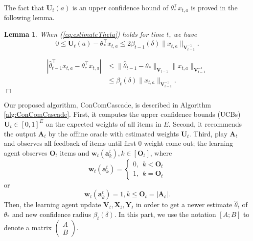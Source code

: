 \documentclass{article}
\newcommand{\bA}{\mathbf{A}}
\newcommand{\ba}{\mathbf{a}}
\newcommand{\bO}{\mathbf{O}}
\newcommand{\bU}{\mathbf{U}}
\newcommand{\bV}{\mathbf{V}}
\newcommand{\bw}{\mathbf{w}}
\newcommand{\bX}{\mathbf{X}}
\newcommand{\bY}{\mathbf{Y}}
\newcommand{\abs}[1]{\left| #1 \right|}
\newcommand{\norm}[1]{\| #1 \|}
\newtheorem{lemma}[theorem]{Lemma}%
\newenvironment{proof}{\noindent {\textbf{Proof. }}}{$\Box$ \medskip}
\begin{document}
The fact that $\bU_t(a)$ is an upper confidence bound of $\theta_*^{\top}x_{t,a}$ is proved in the following lemma.
\begin{lemma}
\label{lem:estimateU}
When (\ref{eq:estimateTheta}) holds for time $t$, we have
$$
0 \leq \bU_t(a) - \theta_{\ast}^{\top}x_{t,a} \leq 2\beta_{t-1}(\delta)\norm{x_{t,a}}_{\bV_{t-1}^{-1}}.
$$
\end{lemma}
\begin{proof}
\begin{align*}
\abs{\hat{\theta}_{t-1}^{\top}x_{t,a} - \theta_{\ast}^{\top}x_{t,a}} &\leq \norm{\hat{\theta}_{t-1} - \theta_{\ast}}_{\bV_{t-1}} \norm{x_{t,a}}_{\bV_{t-1}^{-1}} \\
&\leq \beta_{t}(\delta)\norm{x_{t,a}}_{\bV_{t-1}^{-1}}.
\end{align*}
\end{proof}

Our proposed algorithm, ConComCascade, is described in Algorithm \ref{alg:ConComCascade}. First, it computes the upper confidence bounds (UCBs) $\bU_t \in [0,1]^{E}$ on the expected weights of all items in $E$. Second, it recommends the output $\bA_t$ by the offline oracle with estimated weights $\bU_t$. Third, play $\bA_t$ and observes all feedback of items until first $0$ weight come out; the learning agent observes $\bO_t$ items and $\bw_t(\ba_k^t), k \in [\bO_t]$, where 
$$
\bw_t(\ba_{k}^t) = \begin{cases} 0, ~~k < \bO_t\\ 1, ~~k = \bO_t\end{cases}
$$ 
or
$$
\bw_t(\ba_k^t) = 1, k \leq \bO_t = \abs{\bA_t}.
$$
Then, the learning agent update $\bV_t, \bX_t, \bY_t$ in order to get a newer estimate $\hat{\theta}_t$ of $\theta_*$ and new confidence radius $\beta_t(\delta)$. In this part, we use the notation $[A; B]$ to denote a matrix $\begin{pmatrix} A\\ B\end{pmatrix}$.
\end{document}

